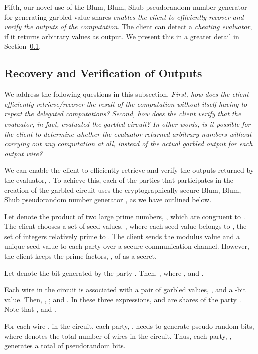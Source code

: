 \documentclass[10pt,journal,cspaper,compsoc]{IEEEtran}
\begin{document}
Fifth, our novel use of the Blum, Blum, Shub pseudorandom number generator for generating garbled value shares {\em enables the client to efficiently recover and verify the outputs of the computation}. The client can detect a {\em cheating evaluator}, if it returns arbitrary values as output. We present this in a greater detail in Section~\ref{sec_output_verification}.\vspace{-1 mm}


\subsection{Recovery and Verification of Outputs}
\label{sec_output_verification}

We address the following questions in this subsection. {\em First, how does the client efficiently retrieve/recover the result of the computation without itself having to repeat the delegated computations? Second, how does the client verify that the evaluator, in fact, evaluated the garbled circuit? In other words, is it possible for the client to determine whether the evaluator returned arbitrary numbers without carrying out any computation at all, instead of the actual garbled output for each output wire?}


We can enable the client to efficiently retrieve and verify the outputs returned by the evaluator, . To achieve this, each of the  parties that participates in the creation of the garbled circuit uses the cryptographically secure Blum, Blum, Shub pseudorandom number generator \cite{blum86,schneier95}, as we have outlined below.


Let  denote the product of two large prime numbers, , which are congruent to   . The client chooses a set of  seed values, , where each seed value  belongs to , the set of integers relatively prime to . The client sends the modulus value  and a unique seed value  to each party  over a secure communication channel. However, the client keeps the prime factors, , of  as a secret.


Let  denote the  bit generated by the party . Then, , where   , and .


Each wire  in the circuit is associated with a pair of garbled values, , and a -bit  value. Then, , ; and . In these three expressions,  and  are shares of the party . Note that , and .


For each wire , in the circuit, each party, , needs to generate  pseudo random bits, where  denotes the total number of wires in the circuit. Thus, each party, , generates a total of  pseudorandom bits.
\end{document}
